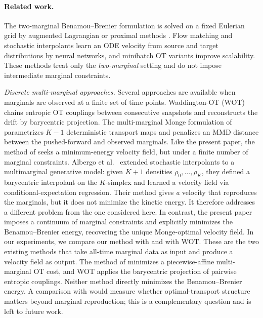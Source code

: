 \documentclass[11pt,leqno]{article}
\theoremstyle{plain}
\theoremstyle{remark}
\theoremstyle{definition}
\numberwithin{equation}{section}
\numberwithin{figure}{section}
\numberwithin{table}{section}
\begin{document}
\paragraph{Related work.}
The two-marginal Benamou--Brenier formulation \cite{ben-bre:2000} is
solved on a fixed Eulerian grid by augmented Lagrangian or proximal
methods \cite{Papadakis2014}.
Flow matching \cite{Lipman2023} and stochastic interpolants
\cite{Albergo2023} learn an ODE velocity from source and target
distributions by neural networks, and minibatch OT variants
\cite{Tong2024} improve scalability.
These methods treat only the \emph{two-marginal} setting and do not
impose intermediate marginal constraints.

\emph{Discrete multi-marginal approaches.}
Several approaches are available when marginals are observed at a
finite set of time points.
Waddington-OT (WOT) \cite{Schiebinger2019} chains entropic OT
couplings between consecutive snapshots and reconstructs the drift by
barycentric projection.
The multi-marginal Monge formulation of \cite{sai-nak:2026}
parametrizes $K-1$ deterministic transport maps and penalizes an MMD
distance between the pushed-forward and observed marginals.
Like the present paper, the method of \cite{sai-nak:2026} seeks a
minimum-energy velocity field, but under a finite number of marginal
constraints.
Albergo et al.~\cite{Albergo2024multimarginal} extended stochastic
interpolants to a multimarginal generative model: given $K{+}1$
densities $\rho_0,\ldots,\rho_K$, they defined a barycentric
interpolant on the $K$-simplex and learned a velocity field via
conditional-expectation regression.
Their method gives \emph{a} velocity that reproduces the marginals,
but it does not minimize the kinetic energy.
It therefore addresses a different problem from the one considered
here.
In contrast, the present paper imposes a continuum of marginal
constraints and explicitly minimizes the Benamou--Brenier energy,
recovering the unique Monge-optimal velocity field.
In our experiments, we compare our method with \cite{sai-nak:2026}
and with WOT.  These are the two existing methods that take
all-time marginal data as input and produce a velocity field as
output.  The method of \cite{sai-nak:2026} minimizes a
piecewise-affine multi-marginal OT cost, and WOT applies the
barycentric projection of pairwise entropic couplings.  Neither
method directly minimizes the Benamou--Brenier energy.  A
comparison with \cite{Albergo2024multimarginal} would measure
whether optimal-transport structure matters beyond marginal
reproduction; this is a complementary question and is left to
future work.
\end{document}
